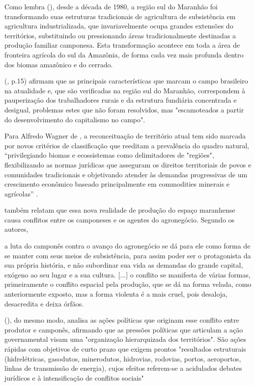 Como lembra  (\citeyear{studte2008}), desde a década de 1980, a região sul do Maranhão foi transformando suas estruturas tradicionais de agricultura de subsistência em agricultura industrializada, que invariavelmente ocupa grandes extensões do territórios, substituindo ou pressionando áreas tradicionalmente destinadas a produção familiar camponesa. Esta transformação acontece em toda a área de fronteira agrícola do sul da Amazônia, de forma cada vez mais profunda dentro dos biomas amazônico e do cerrado.

 (\citeyear{lima_locatel_silva}, p.15) afirmam que as principais características que marcam o campo brasileiro na atualidade e, que são verificadas na região sul do Maranhão, correspondem à pauperização dos trabalhadores rurais e da estrutura fundiária concentrada e desigual, problemas estes que não foram resolvidos, mas "escamoteados a partir do desenvolvimento do capitalismo no campo".

Para Alfredo Wagner de , a reconceituação de território atual tem sido marcada por novos critérios de classificação que reeditam a prevalência do quadro natural, “privilegiando biomas e ecossistemas como delimitadores de "regiões", flexibilizando as normas jurídicas que asseguram os direitos territoriais de povos e comunidades tradicionais e objetivando atender às demandas progressivas de um crescimento econômico baseado principalmente em commodities minerais e agrícolas” \cite{almeida}.

 também relatam que essa nova realidade de produção do espaço maranhense causa conflitos entre os camponeses e os agentes do agronegócio. Segundo os autores, 

\begin{citacao}
a luta do camponês contra o avanço do agronegócio se dá para ele como forma de se manter com seus meios de subsistência, para assim poder ser o protagonista da sua própria história, e não subordinar sua vida as demandas do grande capital, exógeno ao seu lugar e a sua cultura. [...] o conflito se manifesta de várias formas, primeiramente o conflito espacial pela produção, que se dá na forma velada, como anteriormente exposto, mas a forma violenta é a mais cruel, pois desaloja, desacredita e deixa órfãos. \cite[p. 10]{rodrigues_alencar}
\end{citacao}

 (\citeyear{almeida}), do mesmo modo, analisa as ações políticas que originam esse conflito entre produtor e camponês, afirmando que as pressões políticas que articulam a ação governamental visam uma "organização hierarquizada dos territórios". São ações rápidas com objetivos de curto prazo que exigem prontos "resultados estruturais (hidrelétricas, gasodutos, minerodutos, hidrovias, rodovias, portos, aeroportos, linhas de transmissão de energia), cujos efeitos referem-se a acidulados debates jurídicos e à intensificação de conflitos sociais" \cite{almeida}

